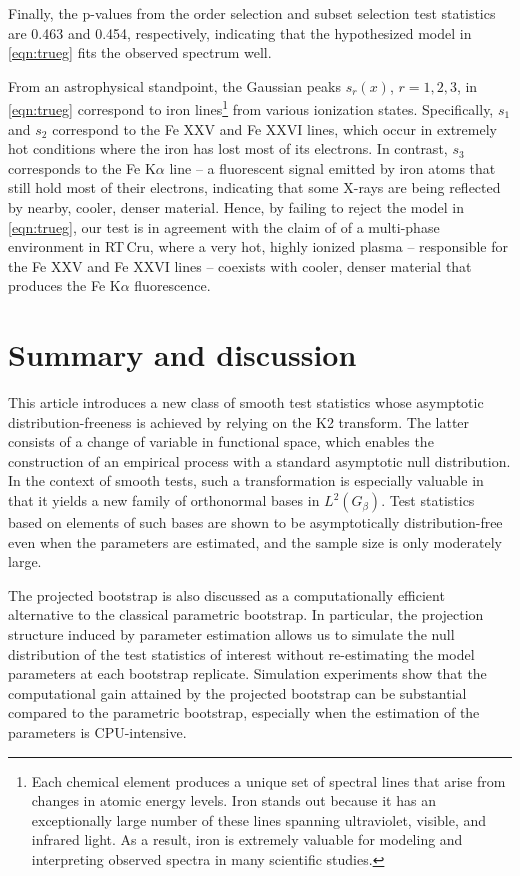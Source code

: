 \documentclass[11pt]{article}
\newcommand{\rtcru}{RT\,Cru}
\begin{document}
Finally, the p-values from the order selection and subset selection test statistics are 0.463 and 0.454, respectively, indicating that the hypothesized model in \eqref{eqn:trueg} fits the observed spectrum well. 

From an astrophysical standpoint, the Gaussian peaks $s_r(x)$, $r=1,2,3$, in \eqref{eqn:trueg} correspond to iron lines\footnote{Each chemical element produces a unique set of spectral lines that arise from changes in atomic energy levels. Iron stands out because it has an exceptionally large number of these lines spanning ultraviolet, visible, and infrared light. As a result, iron is extremely valuable for modeling and interpreting observed spectra in many scientific studies.} from various ionization states. Specifically, $s_1$ and $s_2$ correspond to the Fe XXV and Fe XXVI lines, which occur in extremely hot conditions where the iron has lost most of its electrons. In contrast, $s_3$ corresponds to the Fe K$\alpha$ line -- a fluorescent signal emitted by iron atoms that still hold most of their electrons, indicating that some X-rays  
are being reflected by nearby, cooler, denser material. Hence, by failing to reject the model in  \eqref{eqn:trueg}, our test is in agreement with the claim of \cite{Danehkar2021} of a multi-phase environment in \rtcru, where a very hot, highly ionized plasma -- responsible for the Fe XXV and Fe XXVI lines -- coexists with cooler, denser material that produces the Fe K$\alpha$ fluorescence. 

\section{Summary and discussion}
\label{sec:6}
This article introduces a new class of smooth test statistics whose asymptotic distribution-freeness is achieved by relying on the K2 transform. The latter consists of a change of variable in functional space, which enables the construction of an empirical process with a standard asymptotic null distribution.  In the context of smooth tests, such a transformation is especially valuable in that it yields a new family of orthonormal bases in $L^2(G_{\beta})$. Test statistics based on elements of such bases are shown to be asymptotically distribution-free even when the parameters are estimated, and the sample size is only moderately large. 


The projected bootstrap is also discussed as a computationally efficient alternative to the classical parametric bootstrap. In particular,  the projection structure induced by parameter estimation allows us to simulate the null distribution of the test statistics of interest without re-estimating the model parameters at each bootstrap replicate. Simulation experiments show that the computational gain attained by the projected bootstrap can be substantial compared to the parametric bootstrap, especially when the estimation of the parameters is CPU-intensive. 
\end{document}
